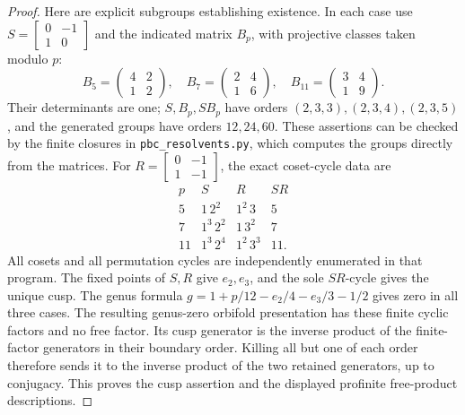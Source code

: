 \begin{proof}
Here are explicit subgroups establishing existence. In each
case use $S=\left[\begin{smallmatrix}0&-1\\1&0\end{smallmatrix}\right]$
and the indicated matrix $B_p$, with projective classes taken
modulo $p$:
\[
 B_5=\begin{pmatrix}4&2\\1&2\end{pmatrix},\quad
 B_7=\begin{pmatrix}2&4\\1&6\end{pmatrix},\quad
 B_{11}=\begin{pmatrix}3&4\\1&9\end{pmatrix}.
\]
Their determinants are one; $S,B_p,SB_p$ have orders
$(2,3,3),(2,3,4),(2,3,5)$, and the generated groups have
orders $12,24,60$. These assertions can be checked by the
finite closures in \texttt{pbc\_resolvents.py}, which computes
the groups directly from the matrices.
For $R=\left[\begin{smallmatrix}0&-1\\1&-1\end{smallmatrix}\right]$,
the exact coset-cycle data are
\[
\begin{array}{c|ccc}
 p&S&R&SR\\\hline
 5&1\,2^2&1^2\,3&5\\
 7&1^3\,2^2&1\,3^2&7\\
 11&1^3\,2^4&1^2\,3^3&11.
\end{array}
\]
All cosets and all permutation cycles are independently
enumerated in that program. The fixed points of $S,R$ give
$e_2,e_3$, and the sole $SR$-cycle gives the unique cusp.
The genus formula
$g=1+p/12-e_2/4-e_3/3-1/2$ gives zero in all three cases.
The resulting genus-zero orbifold presentation has these
finite cyclic factors and no free factor. Its cusp generator
is the inverse product of the finite-factor generators in
their boundary order. Killing all but one of each order
therefore sends it to the inverse product of the two retained
generators, up to conjugacy. This proves the cusp assertion
and the displayed profinite free-product descriptions.
\end{proof}

